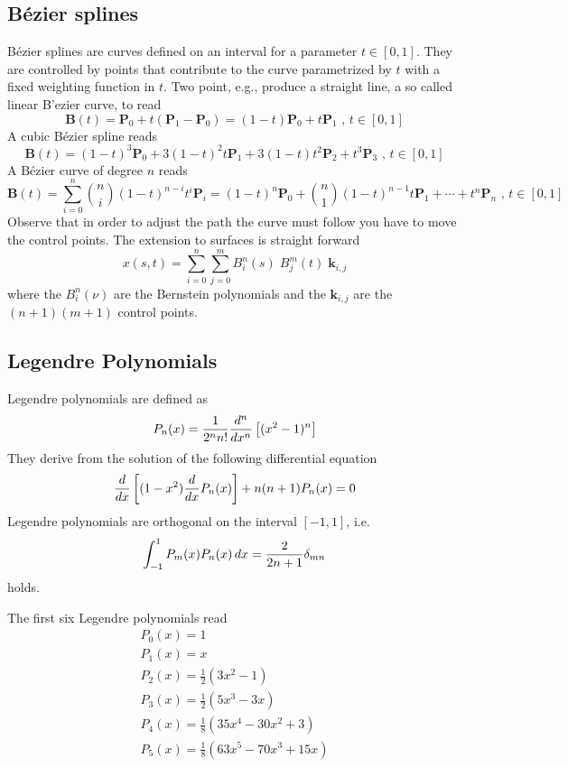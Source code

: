 \subsection{B\'ezier splines}
B\'ezier splines are curves defined on an interval for a parameter $t\in [0,1]$.
They are controlled by points that contribute to the curve parametrized by $t$
with a fixed weighting function in $t$. Two point, e.g., produce a straight
line, a so called linear B'ezier curve, to read
\[     \mathbf{B}(t)=\mathbf{P}_0 + t(\mathbf{P}_1-\mathbf{P}_0)=(1-t)\mathbf{P}_0 + t\mathbf{P}_1 \mbox{ , } t \in [0,1] \]
A cubic B\'ezier spline reads
\[     \mathbf{B}(t)=(1-t)^3\mathbf{P}_0+3(1-t)^2t\mathbf{P}_1+3(1-t)t^2\mathbf{P}_2+t^3\mathbf{P}_3 \mbox{ , } t \in [0,1]\]
A B\'ezier curve of degree $n$ reads
\[ \mathbf{B}(t)=\sum_{i=0}^n {n\choose i}(1-t)^{n-i}t^i\mathbf{P}_i =(1-t)^n\mathbf{P}_0+{n\choose 1}(1-t)^{n-1}t\mathbf{P}_1+\cdots+t^n\mathbf{P}_n \mbox{ , } t \in [0,1]\]
Observe that in order to adjust the path the curve must follow you have to move
the control points. The extension to surfaces is straight forward
\[ x(s,t)=\sum_{i=0}^n \sum_{j=0}^m B_i^n(s) \; B_j^m(t) \; \mathbf{k}_{i,j}\]
where the $B_i^n(\nu)$ are the Bernstein polynomials and the $\mathbf{k}_{i,j}$ are the $(n+1)(m+1)$ control points.
\subsection{Legendre Polynomials}
Legendre polynomials are defined as
\begin{equation}
	    P_n(x) = {1 \over 2^n n!} {d^n \over dx^n } \left[ (x^2 -1)^n \right]
	\label{eq:legendre}
\end{equation}
They derive from the solution of the following differential equation
\[     {d \over dx} \left[ (1-x^2) {d \over dx} P_n(x) \right] + n(n+1)P_n(x) = 0\]
Legendre polynomials are orthogonal on the interval $[-1,1]$, i.e.
\[     \int_{-1}^{1} P_m(x) P_n(x)\,dx = {2 \over {2n + 1}} \delta_{mn} \]
holds.

The first six Legendre polynomials read
\begin{eqnarray*}
 	P_0(x)=1\\
	P_1(x)=x\\
	P_2(x)=\frac{1}{2} (3x^2-1) \\
	P_3(x)=\frac{1}{2} (5x^3-3x) \\
	P_4(x)=\frac{1}{8} (35x^4-30x^2+3)\\
	P_5(x)=\frac{1}{8} (63x^5-70x^3+15x)
\end{eqnarray*}
